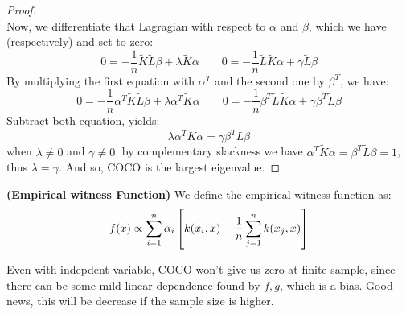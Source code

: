 \begin{proof}
\begin{equation*}
    \end{equation*}
    Now, we differentiate that Lagragian with respect to $\alpha$ and $\beta$, which we have (respectively) and set to zero:
    \begin{equation*}
        0 = -\frac{1}{n}\tilde{K}\tilde{L}\beta + \lambda\tilde{K}\alpha \qquad 0 = -\frac{1}{n}\tilde{L}\tilde{K}\alpha + \gamma\tilde{L}\beta
    \end{equation*}
    By multiplying the first equation with $ \alpha^T $ and the second one by $ \beta^T $, we have:
    \begin{equation*}
        0 = -\frac{1}{n}\alpha^T\tilde{K}\tilde{L}\beta + \lambda\alpha^T\tilde{K}\alpha \qquad 0 = -\frac{1}{n}\beta^T\tilde{L}\tilde{K}\alpha + \gamma\beta^T\tilde{L}\beta 
    \end{equation*}
    Subtract both equation, yields:
    \begin{equation*}
        \lambda\alpha^T\tilde{K}\alpha = \gamma\beta^T\tilde{L}\beta
    \end{equation*}
    when $\lambda\ne0$ and $\gamma\ne0$, by complementary slackness we have $\alpha^T\tilde{K}\alpha = \beta^T\tilde{L}\beta = 1$, thus $\lambda=\gamma$. And so, COCO is the largest eigenvalue. 
\end{proof}

\begin{definition}{\textbf{(Empirical witness Function)}}
    We define the empirical witness function as:
    \begin{equation*}
        f(x)\propto\sum^n_{i=1}\alpha_i\left[ k(x_i, x) - \frac{1}{n}\sum^n_{j=1}k(x_j, x) \right]
    \end{equation*}
\end{definition}

\begin{remark}
    Even with indepdent variable, COCO won't give us zero at finite sample, since there can be some mild linear dependence found by $f, g$, which is a bias. Good news, this will be decrease if the sample size is higher.
\end{remark}

